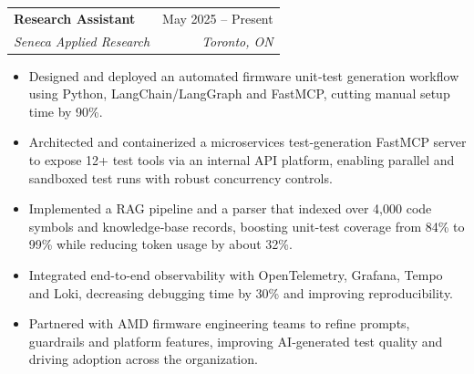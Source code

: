 \documentclass[letterpaper,11pt]{article}
\makeatletter
\newcommand{\resumeItem}[1]{
  \item\small{
    {#1 \vspace{-2pt}}
  }
}
\newcommand{\resumeSubheading}[4]{
  \vspace{-2pt}\item
    \begin{tabular*}{0.97\textwidth}[t]{l@{\extracolsep{\fill}}r}
      \textbf{#1} & #2 \\
      \textit{\small#3} & \textit{\small #4} \\
    \end{tabular*}\vspace{-7pt}
}
\newcommand{\resumeItemListStart}{\begin{itemize}}
\newcommand{\resumeItemListEnd}{\end{itemize}\vspace{-5pt}}
\makeatother
\begin{document}
      
    
    \resumeSubheading
        {Research Assistant}{May 2025 -- Present}
        {Seneca Applied Research}{Toronto, ON}
        \resumeItemListStart
        \resumeItem{Designed and deployed an automated firmware unit‑test generation workflow using Python, LangChain/LangGraph and FastMCP, cutting manual setup time by 90\%.}
        \resumeItem{Architected and containerized a microservices test‑generation FastMCP server to expose 12+ test tools via an internal API platform, enabling parallel and sandboxed test runs with robust concurrency controls.}
        \resumeItem{Implemented a RAG pipeline and a parser that indexed over 4{,}000 code symbols and knowledge‑base records, boosting unit‑test coverage from 84\% to 99\% while reducing token usage by about 32\%.}
        \resumeItem{Integrated end-to-end observability with OpenTelemetry, Grafana, Tempo and Loki, decreasing debugging time by 30\% and improving reproducibility.}
        \resumeItem{Partnered with AMD firmware engineering teams to refine prompts, guardrails and platform features, improving AI‑generated test quality and driving adoption across the organization.}
        \resumeItemListEnd
        
\end{document}
